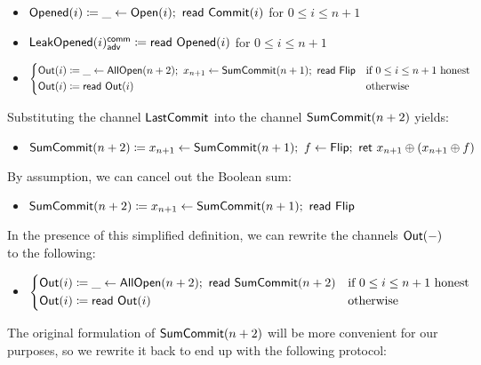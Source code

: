 \begin{itemize}
\item {\color{red} $\mathsf{Opened}(i) \coloneqq \_ \leftarrow \mathsf{Open}(i); \ \mathsf{read} \ \mathsf{Commit}(i)$ for $0 \leq i \leq n+1$}
\item {\color{red} $\mathsf{LeakOpened}(i)^{\mathsf{comm}}_{\mathsf{adv}} \coloneqq \mathsf{read} \ \mathsf{Opened}(i)$ for $0 \leq i \leq n+1$}
\item $\begin{cases*} \Out(i) \coloneqq \_ \leftarrow \AllOpen(n+2); \ x_{n+1} \leftarrow \SumCommit(n+1); \ \read{\Flip} & \text{if $0 \leq i \leq n+1$ honest} \\ \Out(i) \coloneqq \read{\Out(i)} & \text{otherwise} \end{cases*}$
\end{itemize}

\noindent Substituting the channel $\mathsf{LastCommit}$ into the channel $\mathsf{SumCommit}(n+2)$ yields:

\begin{itemize}
\item $\mathsf{SumCommit}(n+2) \coloneqq x_{n+1} \leftarrow \mathsf{SumCommit}(n+1); \ f \leftarrow \mathsf{Flip}; \ \mathsf{ret} \ x_{n+1} \oplus (x_{n+1} \oplus f)$
\end{itemize}

\noindent By assumption, we can cancel out the Boolean sum:

\begin{itemize}
\item $\mathsf{SumCommit}(n+2) \coloneqq x_{n+1} \leftarrow \mathsf{SumCommit}(n+1);
\ \mathsf{read} \ \mathsf{Flip}$
\end{itemize}

\noindent In the presence of this simplified definition, we can rewrite the channels $\mathsf{Out}(-)$ to the following:

\begin{itemize}
\item $\begin{cases*} \Out(i) \coloneqq \_ \leftarrow \AllOpen(n+2); \ \read{\SumCommit(n+2)} & \text{if $0 \leq i \leq n+1$ honest} \\ \Out(i) \coloneqq \read{\Out(i)} & \text{otherwise} \end{cases*}$
\end{itemize}

\noindent The original formulation of $\mathsf{SumCommit}(n+2)$ will be more convenient for our purposes, so we rewrite it back to end up with the following protocol:

